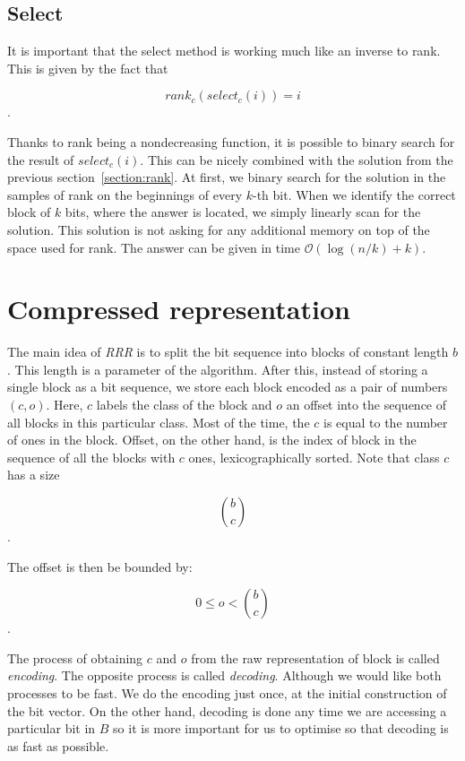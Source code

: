 \subsection{Select}
\label{section:select}

It is important that the select method is working much like an inverse to rank. This is given
by the fact that

                $$rank_c(select_c(i)) = i$$.

Thanks to rank being a nondecreasing function, it is possible to binary search for the result
of $select_c(i)$. This can be nicely combined with the solution from the previous
section~\ref{section:rank}. At first, we binary search for the solution in the samples of rank
on the beginnings of every $k$-th bit. When we identify the correct block of $k$ bits, where
the answer is located, we simply linearly scan for the solution. This solution is not asking
for any additional memory on top of the space used for rank. The answer can be given in time
$\mathcal{O}(\log(n/k)+k)$.

\section{Compressed representation}

The main idea of \textit{RRR} is to split the bit sequence into blocks of constant length $b$.
This length is a parameter of the algorithm. After this, instead
of storing a single block as a bit sequence, we store each block encoded as a pair
of numbers $(c, o)$. Here, $c$ labels the class of the block and $o$ an offset into
the sequence of all blocks in this particular class. Most of the time, the $c$ is equal
to the number of ones in the block. Offset, on the other hand, is the index of block in
the sequence of all the blocks with $c$ ones, lexicographically sorted. Note that
class $c$ has a size

                $${b\choose c}$$.

The offset is then be bounded by:

				$$0 \leq o < {b\choose c}$$.

The process of obtaining $c$ and $o$ from the raw representation of block is called
\textit{encoding}. The opposite process is called \textit{decoding}. Although we would
like both processes to be fast. We do the encoding just once, at the initial construction
of the bit vector. On the other hand, decoding is done any time we are accessing a particular
bit in $B$ so it is more important for us to optimise so that decoding is as fast as possible.

